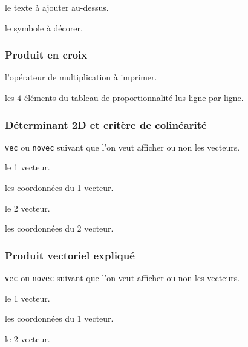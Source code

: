 \documentclass[12pt,a4paper]{article}
\theoremstyle{definition}
\begin{document}
{{{{{{{{{{{ le texte à ajouter au-dessus.

 le symbole à décorer.


\subsubsection{Produit en croix}





 l'opérateur de multiplication à imprimer.

 les $4$ éléments du tableau de proportionnalité lus ligne par ligne.


\subsubsection{Déterminant 2D et critère de colinéarité}






 \verb+vec+ ou \verb+novec+ suivant que l'on veut afficher ou non les vecteurs. 

 le 1\ier{} vecteur.

 les coordonnées du 1\ier{} vecteur.

 le 2\ieme{} vecteur.

 les coordonnées du 2\ieme{} vecteur.


\subsubsection{Produit vectoriel expliqué}






 \verb+vec+ ou \verb+novec+ suivant que l'on veut afficher ou non les vecteurs. 

 le 1\ier{} vecteur.

 les coordonnées du 1\ier{} vecteur.

 le 2\ieme{} vecteur.

}}}}}}}}}}}
\end{document}
